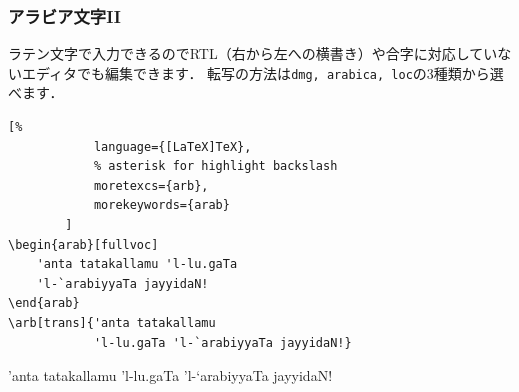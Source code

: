 \documentclass[%
    hyperref={colorlinks,linkcolor=sDarkBlue,urlcolor=sDarkBlue,citecolor=sDarkBlue}
]{beamer}
\begin{document}
    \begin{frame}[fragile]
        \frametitle{アラビア文字II}
        ラテン文字で入力できるのでRTL（右から左への横書き）や合字に対応していないエディタでも編集できます．
        転写の方法は\texttt{dmg, arabica, loc}の3種類から選べます．

        \begin{leftbar}
        \begin{lstlisting}[%
            language={[LaTeX]TeX},
            % asterisk for highlight backslash
            moretexcs={arb},
            morekeywords={arab}
        ]
\begin{arab}[fullvoc]
    'anta tatakallamu 'l-lu.gaTa
    'l-`arabiyyaTa jayyidaN!
\end{arab}
\arb[trans]{'anta tatakallamu
            'l-lu.gaTa 'l-`arabiyyaTa jayyidaN!}
        \end{lstlisting}
        \end{leftbar}

        \begin{arab}[fullvoc]
            'anta tatakallamu 'l-lu.gaTa 'l-`arabiyyaTa jayyidaN!
        \end{arab}

        \bigskip

    \end{frame}
\end{document}
